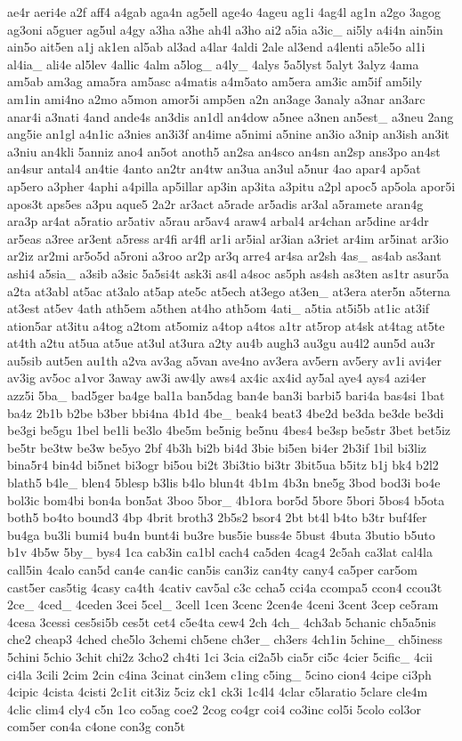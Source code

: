 \begin{DoxyCompactItemize}
ae4r aeri4e a2f aff4 a4gab aga4n ag5ell age4o 4ageu ag1i 4ag4l ag1n a2go 3agog ag3oni a5guer ag5ul a4gy a3ha a3he ah4l a3ho ai2 a5ia a3ic\-\_\- ai5ly a4i4n ain5in ain5o ait5en a1j ak1en al5ab al3ad a4lar 4aldi 2ale al3end a4lenti a5le5o al1i al4ia\-\_\- ali4e al5lev 4allic 4alm a5log\-\_\- a4ly\-\_\- 4alys 5a5lyst 5alyt 3alyz 4ama am5ab am3ag ama5ra am5asc a4matis a4m5ato am5era am3ic am5if am5ily am1in ami4no a2mo a5mon amor5i amp5en a2n an3age 3analy a3nar an3arc anar4i a3nati 4and ande4s an3dis an1dl an4dow a5nee a3nen an5est\-\_\- a3neu 2ang ang5ie an1gl a4n1ic a3nies an3i3f an4ime a5nimi a5nine an3io a3nip an3ish an3it a3niu an4kli 5anniz ano4 an5ot anoth5 an2sa an4sco an4sn an2sp ans3po an4st an4sur antal4 an4tie 4anto an2tr an4tw an3ua an3ul a5nur 4ao apar4 ap5at ap5ero a3pher 4aphi a4pilla ap5illar ap3in ap3ita a3pitu a2pl apoc5 ap5ola apor5i apos3t aps5es a3pu aque5 2a2r ar3act a5rade ar5adis ar3al a5ramete aran4g ara3p ar4at a5ratio ar5ativ a5rau ar5av4 araw4 arbal4 ar4chan ar5dine ar4dr ar5eas a3ree ar3ent a5ress ar4fi ar4fl ar1i ar5ial ar3ian a3riet ar4im ar5inat ar3io ar2iz ar2mi ar5o5d a5roni a3roo ar2p ar3q arre4 ar4sa ar2sh 4as\-\_\- as4ab as3ant ashi4 a5sia\-\_\- a3sib a3sic 5a5si4t ask3i as4l a4soc as5ph as4sh as3ten as1tr asur5a a2ta at3abl at5ac at3alo at5ap ate5c at5ech at3ego at3en\-\_\- at3era ater5n a5terna at3est at5ev 4ath ath5em a5then at4ho ath5om 4ati\-\_\- a5tia at5i5b at1ic at3if ation5ar at3itu a4tog a2tom at5omiz a4top a4tos a1tr at5rop at4sk at4tag at5te at4th a2tu at5ua at5ue at3ul at3ura a2ty au4b augh3 au3gu au4l2 aun5d au3r au5sib aut5en au1th a2va av3ag a5van ave4no av3era av5ern av5ery av1i avi4er av3ig av5oc a1vor 3away aw3i aw4ly aws4 ax4ic ax4id ay5al aye4 ays4 azi4er azz5i 5ba\-\_\- bad5ger ba4ge bal1a ban5dag ban4e ban3i barbi5 bari4a bas4si 1bat ba4z 2b1b b2be b3ber bbi4na 4b1d 4be\-\_\- beak4 beat3 4be2d be3da be3de be3di be3gi be5gu 1bel be1li be3lo 4be5m be5nig be5nu 4bes4 be3sp be5str 3bet bet5iz be5tr be3tw be3w be5yo 2bf 4b3h bi2b bi4d 3bie bi5en bi4er 2b3if 1bil bi3liz bina5r4 bin4d bi5net bi3ogr bi5ou bi2t 3bi3tio bi3tr 3bit5ua b5itz b1j bk4 b2l2 blath5 b4le\-\_\- blen4 5blesp b3lis b4lo blun4t 4b1m 4b3n bne5g 3bod bod3i bo4e bol3ic bom4bi bon4a bon5at 3boo 5bor\-\_\- 4b1ora bor5d 5bore 5bori 5bos4 b5ota both5 bo4to bound3 4bp 4brit broth3 2b5s2 bsor4 2bt bt4l b4to b3tr buf4fer bu4ga bu3li bumi4 bu4n bunt4i bu3re bus5ie buss4e 5bust 4buta 3butio b5uto b1v 4b5w 5by\-\_\- bys4 1ca cab3in ca1bl cach4 ca5den 4cag4 2c5ah ca3lat cal4la call5in 4calo can5d can4e can4ic can5is can3iz can4ty cany4 ca5per car5om cast5er cas5tig 4casy ca4th 4cativ cav5al c3c ccha5 cci4a ccompa5 ccon4 ccou3t 2ce\-\_\- 4ced\-\_\- 4ceden 3cei 5cel\-\_\- 3cell 1cen 3cenc 2cen4e 4ceni 3cent 3cep ce5ram 4cesa 3cessi ces5si5b ces5t cet4 c5e4ta cew4 2ch 4ch\-\_\- 4ch3ab 5chanic ch5a5nis che2 cheap3 4ched che5lo 3chemi ch5ene ch3er\-\_\- ch3ers 4ch1in 5chine\-\_\- ch5iness 5chini 5chio 3chit chi2z 3cho2 ch4ti 1ci 3cia ci2a5b cia5r ci5c 4cier 5cific\-\_\- 4cii ci4la 3cili 2cim 2cin c4ina 3cinat cin3em c1ing c5ing\-\_\- 5cino cion4 4cipe ci3ph 4cipic 4cista 4cisti 2c1it cit3iz 5ciz ck1 ck3i 1c4l4 4clar c5laratio 5clare cle4m 4clic clim4 cly4 c5n 1co co5ag coe2 2cog co4gr coi4 co3inc col5i 5colo col3or com5er con4a c4one con3g con5t 
\end{DoxyCompactItemize}
